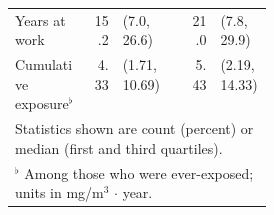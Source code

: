 \documentclass[20pt,final]{beamer}
\newlength{\onecolwid}
\begin{document}
\begin{frame}[t]
\begin{columns}[t,totalwidth=\onecolwid]
\begin{column}{\onecolwid}
{\begin{table}
\begin{tabular}{p{0.3\linewidth}rlcrl}
            Years at work       & 15.2                                               & (7.0, 26.6)   &  & 21.0 & (7.8, 29.9)   \\
            Cumulative exposure$^\flat$
                                & 4.33                                               & (1.71, 10.69) &  & 5.43 & (2.19, 14.33) \\
            \bottomrule
            \multicolumn{6}{l}{\small Statistics shown are count (percent) or median (first and third quartiles).}             \\
            \multicolumn{6}{l}{\small $^\flat$ Among those who were ever-exposed; units in mg/m$^3\,\cdot\,$year.}             \\
            \bottomrule
          \end{tabular}
        \end{table}

}
\end{column}
\end{columns}
\end{frame}
\end{document}
